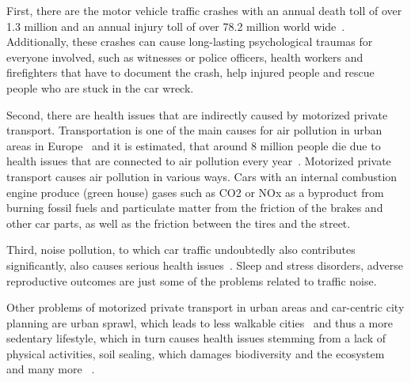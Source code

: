First, there are the motor vehicle traffic crashes with an annual death toll of over 1.3 million and an annual injury toll of over 78.2 million world wide~\cite{bhalla2014transport}.
Additionally, these crashes can cause long-lasting psychological traumas for everyone involved, such as witnesses or police officers, health workers and firefighters that have to document the crash, help injured people and rescue people who are stuck in the car wreck.

Second, there are health issues that are indirectly caused by motorized private transport.
Transportation is one of the main causes for air pollution in urban areas in Europe~\cite{european2019european} and it is estimated, that around 8 million people die due to health issues that are connected to air pollution every year~\cite{forouzanfar2016global}. 
Motorized private transport causes air pollution in various ways.
Cars with an internal combustion engine produce (green house) gases such as CO2 or NOx as a byproduct from burning fossil fuels and particulate matter from the friction of the brakes and other car parts, as well as the friction between the tires and the street.

Third, noise pollution, to which car traffic undoubtedly also contributes significantly, also causes serious health issues~\cite{khreis2016health}.
Sleep and stress disorders, adverse reproductive outcomes are just some of the problems related to traffic noise.

Other problems of motorized private transport in urban areas and car-centric city planning are urban sprawl, which leads to less walkable cities~\cite{patacchini2009urban} and thus a more sedentary lifestyle, which in turn causes health issues stemming from a lack of physical activities, soil sealing, which damages biodiversity and the ecosystem~\cite{tobias2018soil} and many more ~\cite{bozovic2021non,pritchard2022maas,mayers2020whose}.  


